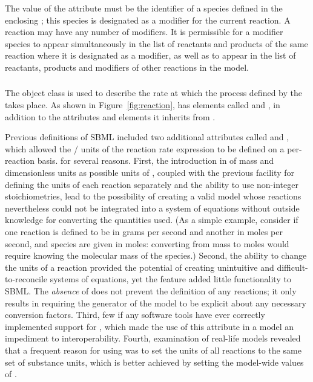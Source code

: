 The value of the  attribute must be the identifier of a
species defined in the enclosing \Model; this species is
designated as a modifier for the current reaction.  A reaction may
have any number of modifiers.  It is permissible for a modifier
species to appear simultaneously in the list of reactants and
products of the same reaction where it is designated as a
modifier, as well as to appear in the list of reactants, products
and modifiers of other reactions in the model.


\subsubsection{}
\label{subsec:kinetic-law}

The \KineticLaw object class is used to describe the rate at which
the process defined by the \Reaction takes place.  As shown in
Figure~\vref{fig:reaction}, \KineticLaw has elements called
 and , in addition to the
attributes and elements it inherits from \SBase.

Previous definitions of SBML included two additional attributes called
 and , which allowed the
/ units of the reaction rate
expression to be defined on a per-reaction basis.  
for several reasons.  First, the introduction
in \sbmltwotwo of mass and dimensionless units as possible units
of , coupled with the previous facility for
defining the units of each reaction separately and the ability to
use non-integer stoichiometries, lead to the possibility of
creating a valid model whose reactions nevertheless could not be
integrated into a system of equations without outside knowledge
for converting the quantities used.  (As a simple example,
consider if one reaction is defined to be in grams per second and
another in moles per second, and species are given in moles:
converting from mass to moles would require knowing the molecular
mass of the species.)  Second, the ability to change the units of
a reaction provided the potential of creating unintuitive and
difficult-to-reconcile systems of equations, yet the feature added
little functionality to SBML.  The \emph{absence} of
 does not prevent the definition of any
reactions; it only results in requiring the generator of the model
to be explicit about any necessary conversion factors.  Third, few
if any software tools have ever correctly implemented support for
, which made the use of this attribute in a
model an impediment to interoperability.  Fourth, examination of
real-life models revealed that a frequent reason for using
 was to set the units of all reactions to
the same set of substance units, which is better achieved by
setting the model-wide values of .


